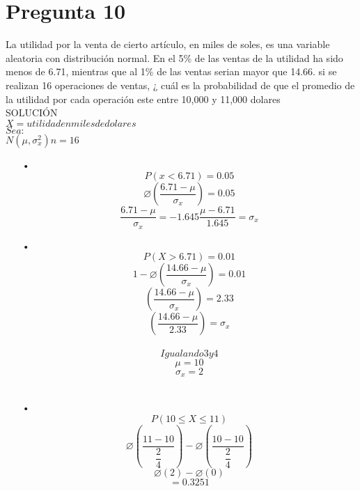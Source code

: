\documentclass[10pt,a4paper]{article}
\begin{document}
\section{Pregunta 10}
La utilidad por la venta de cierto artículo, en miles de soles, es una variable aleatoria con distribución normal. En el 5\% de las ventas de la utilidad ha sido menos de 6.71, mientras que al 1\% de las ventas serian mayor que 14.66. si se realizan  16 operaciones de ventas, ¿ cuál es la probabilidad de que el promedio de la utilidad por cada operación este entre 10,000 y 11,000 dolares\\
SOLUCIÓN\\
$X = utilidad en miles de dolares$\\
$Sea:$\\
$N(\mu,\sigma_{x}^{2})	n = 16$
\begin{itemize}
\item[•]
$$P(x<6.71) = 0.05$$
$$\varnothing(\dfrac{6.71-\mu}{\sigma_{x}}) =0.05$$
\begin{equation}
\dfrac{6.71-\mu}{\sigma_{x}} = -1.645
\dfrac{\mu-6.71}{1.645} = \sigma_{x}
\end{equation}
\item[•]
$$P(X>6.71)=0.01$$
$$1-\varnothing(\dfrac{14.66-\mu}{\sigma_{x}}) = 0.01$$
$$(\dfrac{14.66-\mu}{\sigma_{x}}) = 2.33$$
\begin{equation}
(\dfrac{14.66-\mu}{2.33}) = \sigma_{x} 
\end{equation}\\
$$Igualando 3 y 4$$
$$\mu = 10$$
$$\sigma_{x} = 2$$\\
\item[•]
$$P(10\leq X \leq 11)$$
$$\varnothing(\dfrac{11-10}{\dfrac{2}{4}}) - \varnothing(\dfrac{10-10}{\dfrac{2}{4}})$$
$$\varnothing(2)-\varnothing(0)$$ 
$$= 0.3251$$
\end{itemize}
\end{document}
